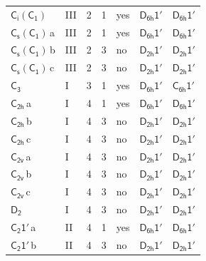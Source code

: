 \documentclass[10pt,a4paper]{article}
\numberwithin{equation}{section}
\newcommand{\grp}[1]{\mathsf{#1}}
\newcommand{\clsletter}[1]{\,{\scriptsize\color{black!55}#1}}
\begin{document}
{\begin{longtable}{@{}llrrlll@{}}
\href{S2-C1.pdf}{$\grp{C_{i}}(\grp{C_{1}})$} & III & 2 & 1 & yes & \href{D6h-1p.pdf}{$\grp{D_{6h}1'}$} & \href{D6h-1p.pdf}{$\grp{D_{6h}1'}$}\\
\href{C1v-C1.pdf}{$\grp{C_{s}}(\grp{C_{1}})$}\clsletter{a} & III & 2 & 1 & yes & \href{D6h-1p.pdf}{$\grp{D_{6h}1'}$} & \href{D6h-1p.pdf}{$\grp{D_{6h}1'}$}\\
\href{C1v-C1.pdf}{$\grp{C_{s}}(\grp{C_{1}})$}\clsletter{b} & III & 2 & 3 & no & \href{D2h-1p.pdf}{$\grp{D_{2h}1'}$} & \href{D2h-1p.pdf}{$\grp{D_{2h}1'}$}\\
\href{C1v-C1.pdf}{$\grp{C_{s}}(\grp{C_{1}})$}\clsletter{c} & III & 2 & 3 & no & \href{D2h-1p.pdf}{$\grp{D_{2h}1'}$} & \href{D2h-1p.pdf}{$\grp{D_{2h}1'}$}\\
\href{../../../rotation/data/pdf/C3.pdf}{$\grp{C_{3}}$} & I & 3 & 1 & yes & \href{D6h-1p.pdf}{$\grp{D_{6h}1'}$} & \href{C6h-1p.pdf}{$\grp{C_{6h}1'}$}\\
\href{../../../rotation/data/pdf/C2h.pdf}{$\grp{C_{2h}}$}\clsletter{a} & I & 4 & 1 & yes & \href{D6h-1p.pdf}{$\grp{D_{6h}1'}$} & \href{D6h-1p.pdf}{$\grp{D_{6h}1'}$}\\
\href{../../../rotation/data/pdf/C2h.pdf}{$\grp{C_{2h}}$}\clsletter{b} & I & 4 & 3 & no & \href{D2h-1p.pdf}{$\grp{D_{2h}1'}$} & \href{D2h-1p.pdf}{$\grp{D_{2h}1'}$}\\
\href{../../../rotation/data/pdf/C2h.pdf}{$\grp{C_{2h}}$}\clsletter{c} & I & 4 & 3 & no & \href{D2h-1p.pdf}{$\grp{D_{2h}1'}$} & \href{D2h-1p.pdf}{$\grp{D_{2h}1'}$}\\
\href{../../../rotation/data/pdf/C2v.pdf}{$\grp{C_{2v}}$}\clsletter{a} & I & 4 & 3 & no & \href{D2h-1p.pdf}{$\grp{D_{2h}1'}$} & \href{D2h-1p.pdf}{$\grp{D_{2h}1'}$}\\
\href{../../../rotation/data/pdf/C2v.pdf}{$\grp{C_{2v}}$}\clsletter{b} & I & 4 & 3 & no & \href{D2h-1p.pdf}{$\grp{D_{2h}1'}$} & \href{D2h-1p.pdf}{$\grp{D_{2h}1'}$}\\
\href{../../../rotation/data/pdf/C2v.pdf}{$\grp{C_{2v}}$}\clsletter{c} & I & 4 & 3 & no & \href{D2h-1p.pdf}{$\grp{D_{2h}1'}$} & \href{D2h-1p.pdf}{$\grp{D_{2h}1'}$}\\
\href{../../../rotation/data/pdf/D2.pdf}{$\grp{D_{2}}$} & I & 4 & 3 & no & \href{D2h-1p.pdf}{$\grp{D_{2h}1'}$} & \href{D2h-1p.pdf}{$\grp{D_{2h}1'}$}\\
\href{C2-1p.pdf}{$\grp{C_{2}1'}$}\clsletter{a} & II & 4 & 1 & yes & \href{D6h-1p.pdf}{$\grp{D_{6h}1'}$} & \href{D6h-1p.pdf}{$\grp{D_{6h}1'}$}\\
\href{C2-1p.pdf}{$\grp{C_{2}1'}$}\clsletter{b} & II & 4 & 3 & no & \href{D2h-1p.pdf}{$\grp{D_{2h}1'}$} & \href{D2h-1p.pdf}{$\grp{D_{2h}1'}$}\\

\end{longtable}}
\end{document}
